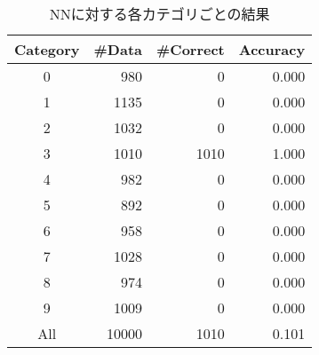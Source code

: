 \documentclass[class=jsarticle, crop=false, dvipdfmx, fleqn]{standalone}
\begin{document}
\begin{table}[H]
	\centering
	\caption{NNに対する各カテゴリごとの結果}
	\begin{tabular}{crrr}
		Category & {\#}Data & {\#}Correct & Accuracy \\ \hline
        0 & 980 & 0 & 0.000 \\
        1 & 1135 & 0 & 0.000 \\
        2 & 1032 & 0 & 0.000 \\
        3 & 1010 & 1010 & 1.000 \\
        4 & 982 & 0 & 0.000 \\
        5 & 892 & 0 & 0.000 \\
        6 & 958 & 0 & 0.000 \\
        7 & 1028 & 0 & 0.000 \\
        8 & 974 & 0 & 0.000 \\
        9 & 1009 & 0 & 0.000 \\
        All & 10000 & 1010 & 0.101 \\
	\end{tabular}
	\label{tab:result_NN}
\end{table}
\end{document}
